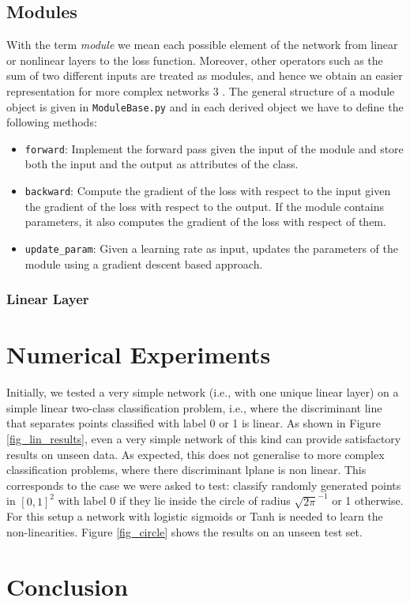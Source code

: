 \documentclass{article}
\begin{document}
\subsection{Modules}
With the term \emph{module} we mean each possible element of the network from linear or nonlinear layers to the loss function. 
Moreover, other operators such as the sum of two different inputs are treated as modules, and hence we obtain an easier representation for more complex networks 3 .
The general structure of a module object is given in \verb|ModuleBase.py| and in each derived object we have to define the following methods:
\begin{itemize}
\item \verb|forward|: Implement the forward pass given the input of the module and store both the input and the output as attributes of the class. 
\item \verb|backward|: Compute the gradient of the loss with respect to the input given the gradient of the loss with respect to the output. If the module contains parameters, it also computes the gradient of the loss with respect of them.
\item \verb|update_param|: Given a learning rate as input, updates the parameters of the module using a gradient descent based approach.
\end{itemize}
\subsubsection{Linear Layer}



\section{Numerical Experiments}\label{sec_numexp}
Initially, we tested a very simple network (i.e., with one unique linear layer) on a simple linear two-class classification problem, i.e., where the discriminant line that separates  points classified with label 0 or 1 is  linear. 
As shown in Figure \ref{fig_lin_results}, even a very simple network of this kind can provide satisfactory results on unseen data.
As expected, this does not generalise to more complex classification problems, where there discriminant lplane is non linear. 
This corresponds to the case we were asked to test: classify  randomly generated points  in $[0,1]^2$ with label 0 if they lie inside the circle of radius $\sqrt{2 \pi}^{-1}$ or 1 otherwise. 
For this setup a network with logistic sigmoids or Tanh is needed to learn the non-linearities.
Figure \ref{fig_circle} shows the results on an unseen test set.

 \section{Conclusion}\label{sec_conclusion}
 
 

 
  
  
  
\end{document}
